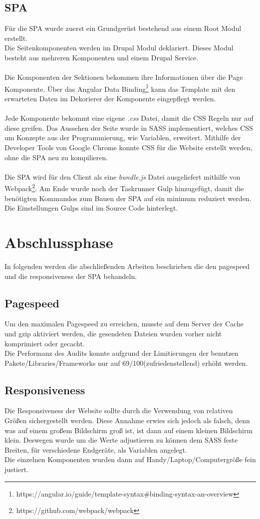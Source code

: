 \documentclass[11pt,a4paper]{article}
\begin{document}
\subsection{SPA}
Für die SPA wurde zuerst ein Grundgerüst bestehend aus einem Root Modul erstellt.\\
Die Seitenkomponenten werden im Drupal Modul deklariert. Dieses Modul besteht aus mehreren Komponenten und einem Drupal Service.\\\\Die Komponenten der Sektionen bekommen ihre Informationen über die Page Komponente. Über das Angular Data Binding\footnote{https://angular.io/guide/template-syntax\#binding-syntax-an-overview} kann das Template mit den erwarteten Daten im Dekorierer der Komponente eingepflegt werden.\\\\
Jede Komponente bekommt eine eigene \textit{.css} Datei, damit die CSS Regeln nur auf diese greifen. Das Aussehen der Seite wurde in SASS implementiert, welches CSS um Konzepte aus der Programmierung, wie Variablen, erweitert.
Mithilfe der Developer Tools von Google Chrome konnte CSS für die Website erstellt werden, ohne die SPA neu zu kompilieren.\\\\
Die SPA wird für den Client als eine \textit{bundle.js} Datei ausgeliefert mithilfe von Webpack\footnote{https://github.com/webpack/webpack}.
Am Ende wurde noch der Taskrunner Gulp hinzugefügt, damit die benötigten Kommandos zum Bauen der SPA auf ein minimum reduziert werden.\\
Die Einstellungen Gulps sind im Source Code hinterlegt.
\section{Abschlussphase}
In folgenden werden die abschließenden Arbeiten beschrieben die den pagespeed und die responsiveness der SPA behandeln.
\subsection{Pagespeed}
Um den maximalen Pagespeed zu erreichen, musste auf dem Server der Cache und gzip aktiviert werden, die gesendeten Dateien wurden vorher nicht komprimiert oder gecacht.\\ Die Performanz des Audits konnte aufgrund der Limitierungen der benutzen Pakete/Libraries/Frameworks nur auf 69/100(zufriedenstellend) erhöht werden.
\subsection{Responsiveness}
Die Responsiveness der Website sollte durch die Verwendung von relativen Größen sichergestellt werden. Diese Annahme erwies sich jedoch als falsch, denn was auf einem großem Bildschirm groß ist, ist dann auf einem kleinen Bildschirm klein. Deswegen wurde um die Werte adjustieren zu können dem \acs{SASS} feste Breiten, für verschiedene Endgeräte, als Variablen angelegt.\\Die einzelnen Komponenten wurden dann auf Handy/Laptop/Computergröße fein justiert.
\end{document}
